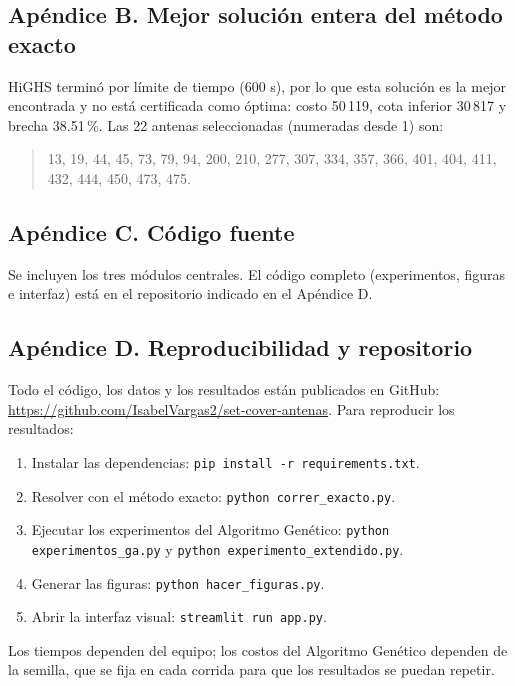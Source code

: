 \subsection*{Apéndice B. Mejor solución entera del método exacto}
HiGHS terminó por límite de tiempo (600 s), por lo que esta solución es la mejor encontrada y no está certificada como óptima: costo 50\,119, cota inferior 30\,817 y brecha 38.51\,\%. Las 22 antenas seleccionadas (numeradas desde 1) son:

\begin{quote}
13, 19, 44, 45, 73, 79, 94, 200, 210, 277, 307, 334, 357, 366, 401, 404, 411, 432, 444, 450, 473, 475.
\end{quote}

\subsection*{Apéndice C. Código fuente}
Se incluyen los tres módulos centrales. El código completo (experimentos, figuras e interfaz) está en el repositorio indicado en el Apéndice D.





\subsection*{Apéndice D. Reproducibilidad y repositorio}
Todo el código, los datos y los resultados están publicados en GitHub: \url{https://github.com/IsabelVargas2/set-cover-antenas}. Para reproducir los resultados:
\begin{enumerate}
\item Instalar las dependencias: \texttt{pip install -r requirements.txt}.
\item Resolver con el método exacto: \texttt{python correr\_exacto.py}.
\item Ejecutar los experimentos del Algoritmo Genético: \texttt{python experimentos\_ga.py} y \texttt{python experimento\_extendido.py}.
\item Generar las figuras: \texttt{python hacer\_figuras.py}.
\item Abrir la interfaz visual: \texttt{streamlit run app.py}.
\end{enumerate}
Los tiempos dependen del equipo; los costos del Algoritmo Genético dependen de la semilla, que se fija en cada corrida para que los resultados se puedan repetir.
